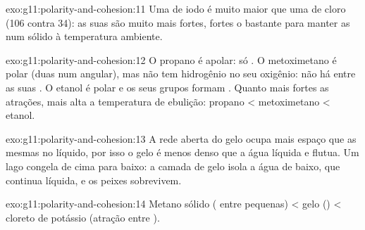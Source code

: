 \begin{solution}{exo:g11:polarity-and-cohesion:11}
Uma  de iodo é muito maior que uma  de cloro (106
 contra 34): as suas  são muito mais
fortes, fortes o bastante para manter as  num sólido à
temperatura ambiente.
\end{solution}

\begin{solution}{exo:g11:polarity-and-cohesion:12}
O propano é apolar: só . O metoximetano é
polar (duas   num  angular), mas não
tem hidrogênio no seu oxigênio: não há  entre as
suas . O etanol é polar e os seus grupos  formam
. Quanto mais fortes as atrações, mais alta a
temperatura de ebulição: propano < metoximetano < etanol.
\end{solution}

\begin{solution}{exo:g11:polarity-and-cohesion:13}
A rede aberta do gelo ocupa mais espaço que as mesmas  no
líquido, por isso o gelo é menos denso que a água líquida e flutua. Um
lago congela de cima para baixo: a camada de gelo isola a água de baixo,
que continua líquida, e os peixes sobrevivem.
\end{solution}

\begin{solution}{exo:g11:polarity-and-cohesion:14}
Metano sólido ( entre  pequenas) <
gelo () < cloreto de potássio (atração entre ).
\end{solution}

